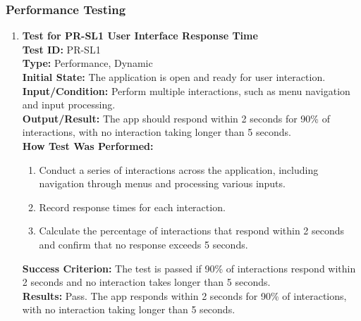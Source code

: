 \documentclass[12pt, titlepage]{article}
\begin{document}
\subsubsection{Performance Testing}
\begin{enumerate}
    \item \textbf{Test for PR-SL1 User Interface Response Time} \\
      \newline
      \textbf{Test ID:} PR-SL1 \\
      \textbf{Type:} Performance, Dynamic \\
      \textbf{Initial State:} The application is open and ready for user interaction. \\
      \textbf{Input/Condition:} Perform multiple interactions, such as menu navigation and input processing. \\
      \textbf{Output/Result:} The app should respond within 2 seconds for 90\% of interactions, with no interaction taking longer 
      than 5 seconds. \\
      \textbf{How Test Was Performed:}
      \begin{enumerate}
          \item Conduct a series of interactions across the application, including navigation through menus and processing various 
          inputs.
          \item Record response times for each interaction.
          \item Calculate the percentage of interactions that respond within 2 seconds and confirm that no response exceeds 5 seconds.
      \end{enumerate}
      \textbf{Success Criterion:} The test is passed if 90\% of interactions respond within 2 seconds and no interaction takes longer
      than 5 seconds.\\
      \textbf{Results:} Pass. The app responds within 2 seconds for 90\% of interactions, with no interaction taking longer than 5 seconds.\\


\end{enumerate}
\end{document}
